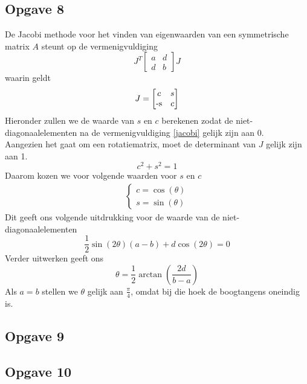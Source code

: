 \documentclass[a4paper, 12pt, titlepage]{report}
\begin{document}
\subsection{Opgave 8}
De Jacobi methode voor het vinden van eigenwaarden van een symmetrische matrix $A$ steunt op de vermenigvuldiging
\begin{equation} \label{jacobi}
 J^T\begin{bmatrix}a & d \\ d & b\end{bmatrix}J
\end{equation}
waarin geldt
\begin{equation}
 J=\begin{bmatrix}c & s\\ $-s$ & c\end{bmatrix}
\end{equation}
Hieronder zullen we de waarde van $s$ en $c$ berekenen zodat de niet-diagonaalelementen na de vermenigvuldiging \eqref{jacobi} gelijk zijn aan 0. \\
Aangezien het gaat om een rotatiematrix, moet de determinant van $J$ gelijk zijn aan 1.
\begin{equation}
 c^2+s^2=1
\end{equation}
Daarom kozen we voor volgende waarden voor $s$ en $c$
\begin{equation}
\begin{align}
 \begin{cases}
  c=\cos(\theta)\\
  s=\sin(\theta)
 \end{cases}
 \end{align}
\end{equation}
Dit geeft ons volgende uitdrukking voor de waarde van de niet-diagonaalelementen
\begin{equation}
 \frac{1}{2}\sin(2\theta)(a-b) + d\cos(2\theta) = 0
\end{equation}
Verder uitwerken geeft ons
\begin{equation}
 \theta = \frac{1}{2}\arctan(\frac{2d}{b-a})
\end{equation}
Als $a=b$ stellen we $\theta$ gelijk aan $\frac{\pi}{4}$, omdat bij die hoek de boogtangens oneindig is. 





\subsection{Opgave 9}

\subsection{Opgave 10}
\end{document}
